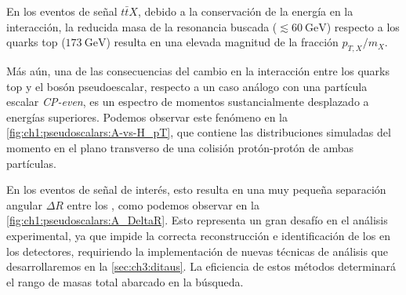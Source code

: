 En los eventos de señal $t\bar{t}X$, debido a la conservación de la energía en la interacción, la reducida masa de la resonancia buscada ($\lesssim \SI{60}{\GeV}$) respecto a los quarks top ($\SI{173}{\GeV}$) resulta en una elevada magnitud de la fracción $p_{T, X}/m_X$.

Más aún, una de las consecuencias del cambio en la interacción entre los quarks top y el bosón pseudoescalar, respecto a un caso análogo con una partícula escalar \textit{CP-even}, es un espectro de momentos sustancialmente desplazado a energías superiores. Podemos observar este fenómeno en la \cref{fig:ch1:pseudoscalars:A-vs-H_pT}, que contiene las distribuciones simuladas del momento en el plano transverso de una colisión protón-protón de ambas partículas.

En los eventos de señal de interés, esto resulta en una muy pequeña separación angular $\Delta R$ entre los \ttaus, como podemos observar en la \cref{fig:ch1:pseudoscalars:A_DeltaR}. Esto representa un gran desafío en el análisis experimental, ya que impide la correcta reconstrucción e identificación de los \thads en los detectores, requiriendo la implementación de nuevas técnicas de análisis que desarrollaremos en la \cref{sec:ch3:ditaus}. La eficiencia de estos métodos determinará el rango de masas total abarcado en la búsqueda.


\cleardoublepage{}